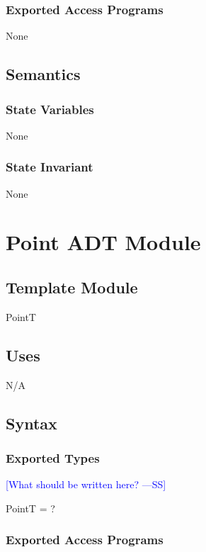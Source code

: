 \documentclass[12pt]{article}
\newcommand{\authornote}[3]{\textcolor{#1}{[#3 ---#2]}}
\newcommand{\authornote}[3]{}
\newcommand{\wss}[1]{\authornote{blue}{SS}{#1}}
\begin{document}
\subsubsection* {Exported Access Programs}

None

\subsection* {Semantics}

\subsubsection* {State Variables}

None

\subsubsection* {State Invariant}

None

\newpage

\section* {Point ADT Module}

\subsection*{Template Module}

PointT

\subsection* {Uses}

N/A

\subsection* {Syntax}

\subsubsection* {Exported Types}

\wss{What should be written here?}

PointT = ?

\subsubsection* {Exported Access Programs}
\end{document}
